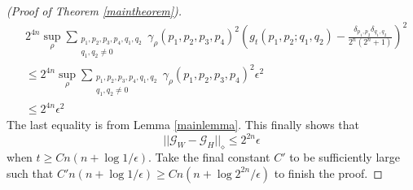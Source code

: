 \documentclass[12pt]{amsart}
\theoremstyle{definition}
\theoremstyle{remark}
\numberwithin{equation}{section}
\theoremstyle{remark}
\begin{document}
\begin{proof}[(Proof of Theorem \ref{maintheorem})]
  \begin{align*}
  &   2^{4n} \sup_{\rho} \sum_{\substack{p_1,p_2,p_3,p_4,q_1,q_2 \\ q_1,q_2 \neq 0}} \gamma_{\rho}(p_1,p_2,p_3,p_4)^2 \left( g_t(p_1,p_2;q_1,q_2) - \frac{\delta_{p_1,p_2}\delta_{q_1,q_2}}{2^n(2^n+1)} \right)^2 \\
    & \leq 2^{4n} \sup_{\rho} \sum_{\substack{p_1,p_2,p_3,p_4,q_1,q_2 \\ q_1,q_2 \neq 0}} \gamma_{\rho}(p_1,p_2,p_3,p_4)^2 \epsilon^2 \\
    & \leq 2^{4n}\epsilon^2
  \end{align*}
  The last equality is from Lemma \ref{mainlemma}. This finally shows that
  \begin{equation}
    ||\mathcal{G}_W - \mathcal{G}_H ||_{\diamond} \leq 2^{2n}\epsilon
  \end{equation}
  when $t \geq Cn(n + \log{1/\epsilon})$. Take the final constant $C'$ to be sufficiently large such that $C'n(n + \log{1/\epsilon}) \geq Cn(n + \log{2^{2n}/\epsilon})$ to finish the proof.
\end{proof}


\newpage


\end{document}
